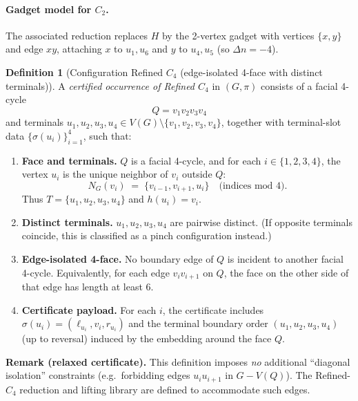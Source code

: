 \documentclass[12pt]{article}
\theoremstyle{definition}
\newtheorem{definition}[theorem]{Definition}
\newcommand{\CtwoGadgetVertices}{2}
\newcommand{\CtwoDelta}{-4}
\begin{document}
\paragraph{Gadget model for $C_2$.}
The associated reduction replaces $H$ by the \CtwoGadgetVertices-vertex gadget with vertices $\{x,y\}$ and edge $xy$, attaching $x$ to $u_1,u_6$ and $y$ to $u_4,u_5$ (so $\Delta n = \CtwoDelta$).

\medskip

\begin{definition}[Configuration Refined $C_4$ (edge-isolated 4-face with distinct terminals)]
\label{def:refinedC4-occ}
A \emph{certified occurrence of Refined $C_4$} in $(G,\pi)$ consists of a facial
4-cycle
\[
Q=v_1v_2v_3v_4
\]
and terminals $u_1,u_2,u_3,u_4\in V(G)\setminus\{v_1,v_2,v_3,v_4\}$,
together with terminal-slot data $\{\sigma(u_i)\}_{i=1}^4$, such that:

\begin{enumerate}
\item \textbf{Face and terminals.}
$Q$ is a facial 4-cycle, and for each $i\in\{1,2,3,4\}$,
the vertex $u_i$ is the unique neighbor of $v_i$ outside $Q$:
\[
N_G(v_i)\;=\;\{v_{i-1},v_{i+1},u_i\}\quad\text{(indices mod $4$)}.
\]
Thus $T=\{u_1,u_2,u_3,u_4\}$ and $h(u_i)=v_i$.

\item \textbf{Distinct terminals.}
$u_1,u_2,u_3,u_4$ are pairwise distinct.
(If opposite terminals coincide, this is classified as a pinch configuration instead.)

\item \textbf{Edge-isolated 4-face.}
No boundary edge of $Q$ is incident to another facial 4-cycle.
Equivalently, for each edge $v_iv_{i+1}$ on $Q$, the face on the other side of that edge
has length at least $6$.

\item \textbf{Certificate payload.}
For each $i$, the certificate includes $\sigma(u_i)=(\ell_{u_i},v_i,r_{u_i})$ and the terminal boundary order $(u_1,u_2,u_3,u_4)$ (up to reversal) induced by the embedding around the face $Q$.
\end{enumerate}

\smallskip
\noindent
\textbf{Remark (relaxed certificate).}
This definition imposes \emph{no} additional ``diagonal isolation''
constraints (e.g.\ forbidding edges $u_iu_{i+1}$ in $G-V(Q)$). The Refined-$C_4$
reduction and lifting library are defined to accommodate such edges.
\end{definition}
\end{document}
